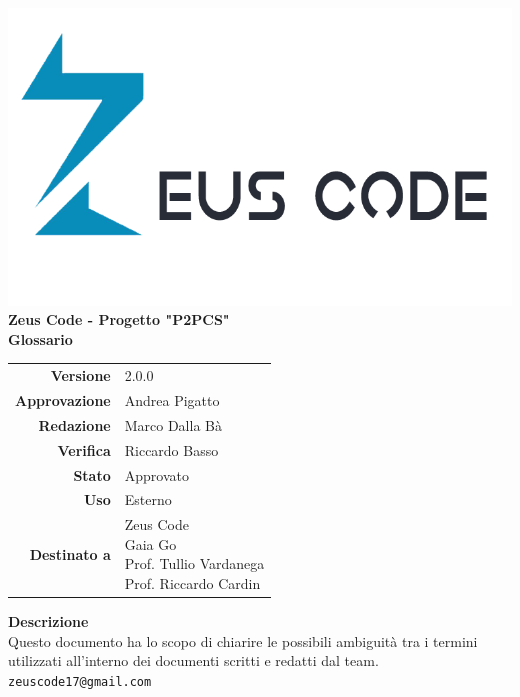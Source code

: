 \thispagestyle{empty}
\begin{titlepage}
	\begin{center}
		\includegraphics[scale = 0.3]{res/images/zeus_code_logo.png}\\
		\large \textbf{Zeus Code - Progetto "P2PCS"} \\
		\vfill
		\Huge \textbf{Glossario}
		\vspace*{\fill} 
        \vfill
        \large
        \begin{tabular}{r|l}
                        \textbf{Versione} & 2.0.0\\
                        \textbf{Approvazione} &Andrea Pigatto\\
                        \textbf{Redazione} & Marco Dalla Bà\\
                        
                        \textbf{Verifica} & Riccardo Basso\\
                        \textbf{Stato} & Approvato\\
                        \textbf{Uso} & Esterno\\
                        \textbf{Destinato a} & \parbox[t]{5cm}{Zeus Code\\ Gaia Go\\Prof. Tullio Vardanega\\Prof. Riccardo Cardin}
                \end{tabular}
                \vfill
                \normalsize
                \textbf{Descrizione}\\
                Questo documento ha lo scopo di chiarire le possibili ambiguità tra i termini utilizzati all'interno dei documenti scritti e redatti dal team.\\
                \vfill
                \small
                \texttt{zeuscode17@gmail.com}
	\end{center}
\end{titlepage}
